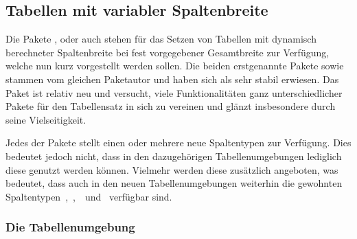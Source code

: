 \documentclass[%
  english,ngerman,%
  cdgeometry=no,DIV=12,%
  cd=false,cdfont=false,cdtitle=true,%
  headings=normal,%
  automark,%
  listof=toc,%
]{tudscrartcl}
\begin{document}
\subsection{Tabellen mit variabler Spaltenbreite}

Die Pakete ,  oder auch  
stehen für das Setzen von Tabellen mit dynamisch berechneter Spaltenbreite bei 
fest vorgegebener Gesamtbreite zur Verfügung, welche nun kurz vorgestellt 
werden sollen. Die beiden erstgenannte Pakete  sowie 
 stammen vom gleichen Paketautor und haben sich als sehr 
stabil erwiesen. Das Paket  ist relativ neu und versucht, viele 
Funktionalitäten ganz unterschiedlicher Pakete für den Tabellensatz in sich zu 
vereinen und glänzt insbesondere durch seine Vielseitigkeit. 
%
\begin{Preamble}
\usepackage{tabularx}
\usepackage{tabulary}
\usepackage{tabu}
\usepackage{longtable}

\end{Preamble}
%
Jedes der Pakete stellt einen oder mehrere neue Spaltentypen zur Verfügung. 
Dies bedeutet jedoch nicht, dass in den dazugehörigen Tabellenumgebungen 
lediglich diese genutzt werden können. Vielmehr werden diese zusätzlich 
angeboten, was bedeutet, dass auch in den neuen Tabellenumgebungen weiterhin 
die gewohnten Spaltentypen~,~,~~und~ 
verfügbar sind.



\subsubsection{%
  Die Tabellenumgebung %
  \label{sec:tabularx}%
}
\end{document}
